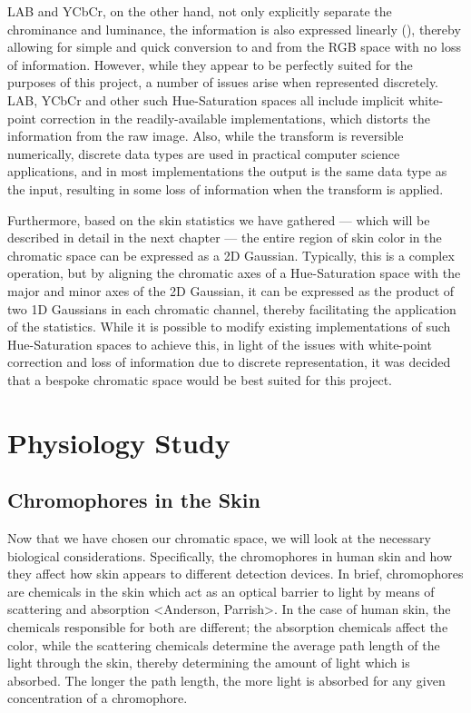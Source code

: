 LAB and YCbCr, on the other hand, not only explicitly separate the chrominance and luminance, the information is also expressed linearly (\cite{Vezhnevets2003,Poynton1997,Phung2002a}), thereby allowing for simple and quick conversion to and from the RGB space with no loss of information. However, while they appear to be perfectly suited for the purposes of this project, a number of issues arise when represented discretely. LAB, YCbCr and other such Hue-Saturation spaces all include implicit white-point correction in the readily-available implementations, which distorts the information from the raw image. Also, while the transform is reversible numerically, discrete data types are used in practical computer science applications, and in most implementations the output is the same data type as the input, resulting in some loss of information when the transform is applied.

Furthermore, based on the skin statistics we have gathered --- which will be described in detail in the next chapter --- the entire region of skin color in the chromatic space can be expressed as a 2D Gaussian. Typically, this is a complex operation, but by aligning the chromatic axes of a Hue-Saturation space with the major and minor axes of the 2D Gaussian, it can be expressed as the product of two 1D Gaussians in each chromatic channel, thereby facilitating the application of the statistics. While it is possible to modify existing implementations of such Hue-Saturation spaces to achieve this, in light of the issues with white-point correction and loss of information due to discrete representation, it was decided that a bespoke chromatic space would be best suited for this project.


\section{Physiology Study}\label{sec:PhysiologyStudy}

\subsection{Chromophores in the Skin}

Now that we have chosen our chromatic space, we will look at the necessary biological considerations. Specifically, the chromophores in human skin and how they affect how skin appears to different detection devices. In brief, chromophores are chemicals in the skin which act as an optical barrier to light by means of scattering and absorption <Anderson, Parrish>. In the case of human skin, the chemicals responsible for both are different; the absorption chemicals affect the color, while the scattering chemicals determine the average path length of the light through the skin, thereby determining the amount of light which is absorbed. The longer the path length, the more light is absorbed for any given concentration of a chromophore. 

